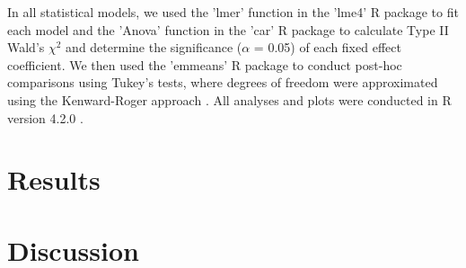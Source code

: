     In all statistical models, we used the 'lmer' function in the 'lme4' R package  to fit each model and the 'Anova' function in the 'car' R package  to calculate Type II Wald's $\chi^{2}$ and determine the significance ($\alpha$ = 0.05) of each fixed effect coefficient. We then used the 'emmeans' R package  to conduct post-hoc comparisons using Tukey's tests, where degrees of freedom were approximated using the Kenward-Roger approach . All analyses and plots were conducted in R version 4.2.0 .

    \section{Results}

    

    \section{Discussion}